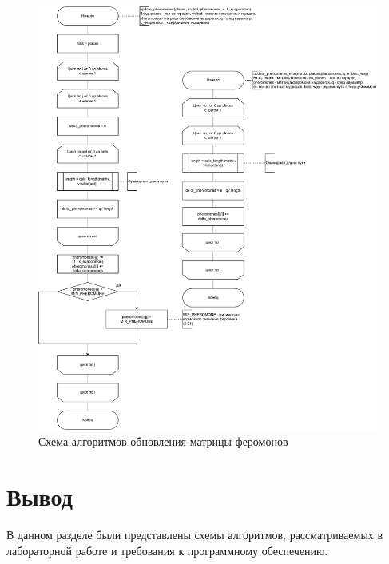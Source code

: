 \begin{figure}[h!]
	\centering
	\includegraphics[width=\linewidth]{img/ant_phero}
	\caption{Схема алгоритмов обновления матрицы феромонов}
	\label{fig:ant_phero}
\end{figure}


\section*{Вывод}

В данном разделе были представлены схемы алгоритмов, рассматриваемых в лабораторной работе и требования к программному обеспечению.

